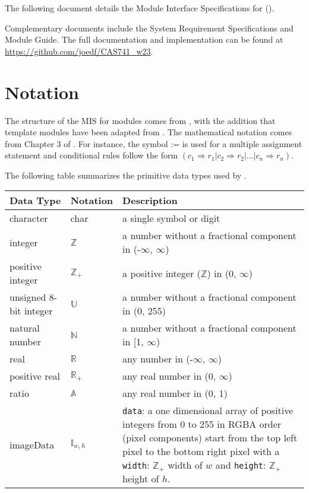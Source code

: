 \documentclass[12pt, titlepage]{article}
\newcommand{\code}[1]{\texttt{#1}}
\begin{document}
The following document details the Module Interface Specifications for
\progname{} (\prognamelong{}).

Complementary documents include the System Requirement Specifications
and Module Guide.  The full documentation and implementation can be
found at \url{https://github.com/joedf/CAS741_w23}.

\section{Notation}

The structure of the MIS for modules comes from \citet{HoffmanAndStrooper1995},
with the addition that template modules have been adapted from
\cite{GhezziEtAl2003}.  The mathematical notation comes from Chapter 3 of
\citet{HoffmanAndStrooper1995}.  For instance, the symbol := is used for a
multiple assignment statement and conditional rules follow the form $(c_1
\Rightarrow r_1 | c_2 \Rightarrow r_2 | ... | c_n \Rightarrow r_n )$.

The following table summarizes the primitive data types used by \progname. 

\begin{center}
\renewcommand{\arraystretch}{1.2}
\noindent 
\begin{tabular}{l l p{7.5cm}} 
\toprule 
\textbf{Data Type} & \textbf{Notation} & \textbf{Description}\\ 
\midrule
character & char & a single symbol or digit\\
integer & $\mathbb{Z}$ & a number without a fractional component in (-$\infty$, $\infty$) \\
positive integer & $\mathbb{Z}_+$ & a positive integer ($\mathbb{Z}$) in (0, $\infty$) \\
unsigned 8-bit integer & $\mathbb{U}$ & a number without a fractional component in (0, 255)\\
natural number & $\mathbb{N}$ & a number without a fractional component in [1, $\infty$) \\
real & $\mathbb{R}$ & any number in (-$\infty$, $\infty$)\\
positive real & $\mathbb{R}_+$ & any real number in (0, $\infty$)\\
ratio & $\mathbb{A}$ & any real number in (0, 1)\\
imageData \cite{MDN_imagedata} & $\mathbb{I}_{w,h}$ & \code{data}: a one dimensional array of positive integers from
  0 to 255 in RGBA order (pixel components) start from the top left pixel to the
  bottom right pixel with a \code{width}: $\mathbb{Z}_+$ width of $w$
  and \code{height}: $\mathbb{Z}_+$ height of $h$.\\
\bottomrule
\end{tabular} 
\end{center}
\end{document}
